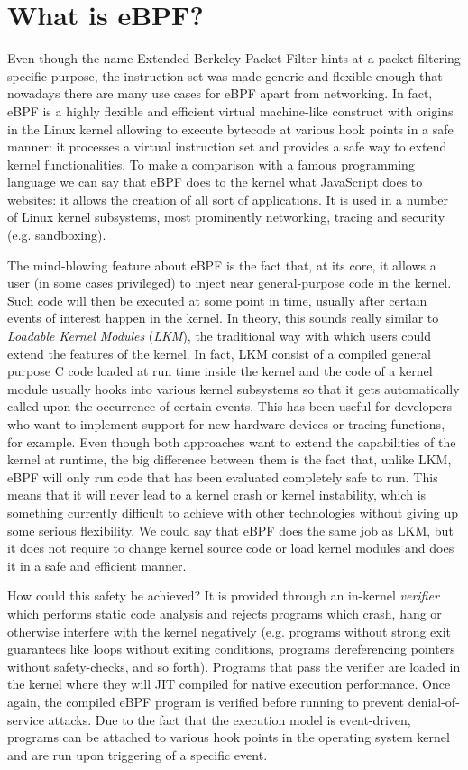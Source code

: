 \section{What is eBPF?}

Even though the name Extended Berkeley Packet Filter hints at a packet filtering specific purpose, the instruction set was made generic and flexible enough that nowadays there are many use cases for eBPF apart from networking. 
In fact, eBPF is a highly flexible and efficient virtual machine-like construct with origins in the Linux kernel allowing to execute bytecode at various hook points in a safe manner: it processes a virtual instruction set and provides a safe way to extend kernel functionalities.
To make a comparison with a famous programming language we can say that eBPF does to the kernel what JavaScript does to websites: it allows the creation of all sort of applications.
It is used in a number of Linux kernel subsystems, most prominently networking, tracing and security (e.g. sandboxing).

The mind-blowing feature about eBPF is the fact that, at its core, it allows a user (in some cases privileged) to inject near general-purpose code in the kernel. 
Such code will then be executed at some point in time, usually after certain events of interest happen in the kernel. 
In theory, this sounds really similar to \textit{Loadable Kernel Modules} (\textit{LKM}), the traditional way with which users could extend the features of the kernel.
In fact, LKM consist of a compiled general purpose C code loaded at run time inside the kernel and the code of a kernel module usually hooks into various kernel subsystems so that it gets automatically called upon the occurrence of certain events.
This has been useful for developers who want to implement support for new hardware devices or tracing functions, for example.
Even though both approaches want to extend the capabilities of the kernel at runtime, the big difference between them is the fact that, unlike LKM, eBPF will only run code that has been evaluated completely safe to run.
This means that it will never lead to a kernel crash or kernel instability, which is something currently difficult to achieve with other technologies without giving up some serious flexibility. 
We could say that eBPF does the same job as LKM, but it does not require to change kernel source code or load kernel modules and does it in a safe and efficient manner.

How could this safety be achieved? It is provided through an in-kernel \textit{verifier} which performs static code analysis and rejects programs which crash, hang or otherwise interfere with the kernel negatively (e.g. programs without strong exit guarantees like loops without exiting conditions, programs dereferencing pointers without safety-checks, and so forth).
Programs that pass the verifier are loaded in the kernel where they will JIT compiled for native execution performance.
Once again, the compiled eBPF program is verified before running to prevent denial-of-service attacks.
Due to the fact that the execution model is event-driven, programs can be attached to various hook points in the operating system kernel and are run upon triggering of a specific event.

